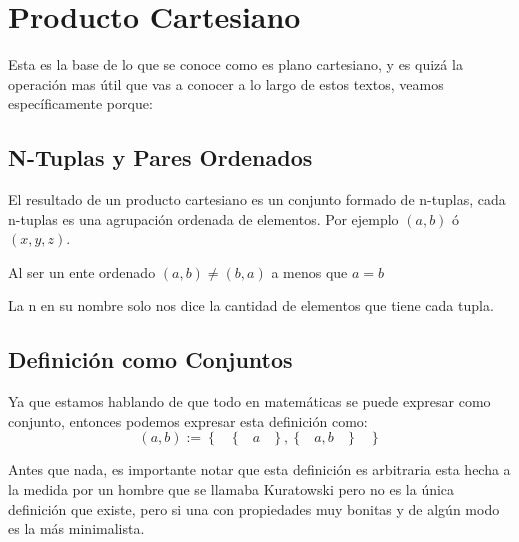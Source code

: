 \documentclass[12pt, fleqn]{report}                             %
\DeclareMathOperator \Space {\quad}                             %
\DeclareMathOperator \MiniSpace {\;}                            %
\newcommand{\Set}[1]{\left\{ \MiniSpace #1 \MiniSpace \right\}} %
\begin{document}
        \clearpage
        \section{Producto Cartesiano}

            Esta es la base de lo que se conoce como es plano cartesiano, y es quizá
            la operación mas útil que vas a conocer a lo largo de estos textos,
            veamos específicamente porque:


            \subsection{N-Tuplas y Pares Ordenados}

                El resultado de un producto cartesiano es un conjunto formado de n-tuplas,
                cada n-tuplas es una agrupación ordenada de elementos.
                Por ejemplo $(a,b)$ ó $(x,y,z)$.


                Al ser un ente ordenado $(a,b) \neq (b,a)$ a menos que $a=b$

                La n en su nombre solo nos dice la cantidad de elementos que tiene cada tupla.



                \subsection*{Definición como Conjuntos}

                    Ya que estamos hablando de que todo en matemáticas se puede expresar como
                    conjunto, entonces podemos expresar esta definición como:
                    \begin{equation*}
                        (a, b) := \Set{ \Set{a}, \Set{a, b} }
                    \end{equation*}

                    Antes que nada, es importante notar que esta definición es arbitraria
                    esta hecha a la medida por un hombre que se llamaba Kuratowski pero
                    no es la única definición que existe, pero si una con propiedades muy
                    bonitas y de algún modo es la más minimalista.
\end{document}
